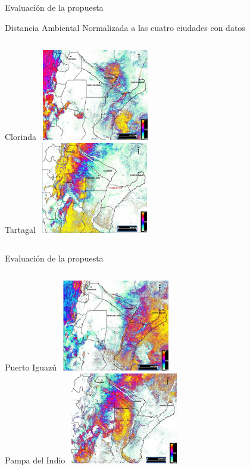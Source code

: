 \documentclass[10pt]{beamer}
\begin{document}
\begin{frame}{Evaluación de la propuesta}
  \begin{center}
    Distancia Ambiental Normalizada a las cuatro ciudades con datos
  \end{center}

  \begin{columns}[t]
  \centering
  Clorinda
  \includegraphics[width=5cm,height=4cm]{ned_clorinda}\\
  \centering
  Tartagal
  \includegraphics[width=5cm,height=4cm]{ned_tartagal}
  \end{columns}

\end{frame}

\begin{frame}{Evaluación de la propuesta}

    \begin{columns}[t]
    \centering
    Puerto Iguazú
    \includegraphics[width=5cm,height=4cm]{ned_iguazu}\\
    \centering
    Pampa del Indio
    \includegraphics[width=5cm,height=4cm]{ned_pampa}
    \end{columns}

\end{frame}
\end{document}
